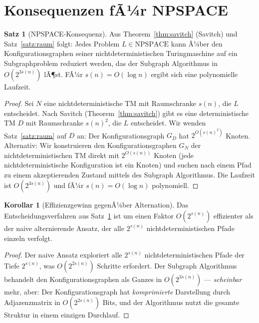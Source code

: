 ﻿\documentclass[a4paper,12pt]{article}
\theoremstyle{definition}
\newtheorem{satz}{Satz}
\newtheorem{korollar}{Korollar}
\begin{document}
\section{Konsequenzen fÃ¼r NPSPACE}
\label{sec:npspace}

\begin{satz}[NPSPACE-Konsequenz]
\label{satz:npspace}
  Aus Theorem~\ref{thm:savitch} (Savitch) und Satz~\ref{satz:raum} folgt:
  Jedes Problem $L \in \mathrm{NPSPACE}$ kann Ã¼ber den Konfigurationsgraphen
  seiner nichtdeterministischen Turingmaschine auf ein Subgraphproblem reduziert
  werden, das der Subgraph Algorithmus in $O(2^{3s(n)})$ lÃ¶st.
  FÃ¼r $s(n) = O(\log n)$ ergibt sich eine polynomielle Laufzeit.
\end{satz}

\begin{proof}
  Sei $N$ eine nichtdeterministische TM mit Raumschranke $s(n)$, die $L$ entscheidet.
  Nach Savitch (Theorem~\ref{thm:savitch}) gibt es eine deterministische TM $D$ mit
  Raumschranke $s(n)^2$, die $L$ entscheidet.
  Wir wenden Satz~\ref{satz:raum} auf $D$ an: Der Konfigurationsgraph $G_D$
  hat $2^{O(s(n)^2)}$ Knoten.
  Alternativ: Wir konstruieren den Konfigurationsgraphen $G_N$ der nichtdeterministischen
  TM direkt mit $2^{O(s(n))}$ Knoten (jede nichtdeterministische Konfiguration ist ein Knoten)
  und suchen nach einem Pfad zu einem akzeptierenden Zustand mittels des Subgraph Algorithmus.
  Die Laufzeit ist $O(2^{3s(n)})$ und fÃ¼r $s(n) = O(\log n)$ polynomiell.
\end{proof}

\begin{korollar}[Effizienzgewinn gegenÃ¼ber Alternation]
  Das Entscheidungsverfahren aus Satz~\ref{satz:npspace} ist um einen Faktor
  $O(2^{s(n)})$ effizienter als der naive alternierende Ansatz,
  der alle $2^{s(n)}$ nichtdeterministischen Pfade einzeln verfolgt.
\end{korollar}

\begin{proof}
  Der naive Ansatz exploriert alle $2^{s(n)}$ nichtdeterministischen Pfade
  der Tiefe $2^{s(n)}$, was $O(2^{2s(n)})$ Schritte erfordert.
  Der Subgraph Algorithmus behandelt den Konfigurationsgraphen als Ganzes
  in $O(2^{3s(n)})$ --- \textit{scheinbar} mehr, aber: Der Konfigurationsgraph
  hat \emph{komprimierte} Darstellung durch Adjazenzmatrix in $O(2^{2s(n)})$ Bits,
  und der Algorithmus nutzt die gesamte Struktur in einem einzigen Durchlauf.
\end{proof}
\end{document}
